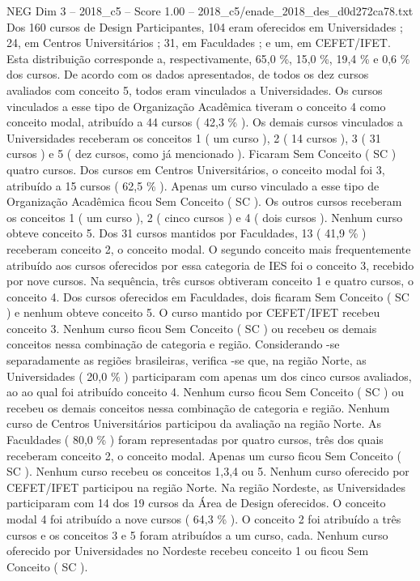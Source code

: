 \begin{textsample}{NEG Dim 3 – 2018\_c5 – Score 1.00 – 2018\_c5/enade\_2018\_des\_d0d272ca78.txt}
Dos 160 cursos de Design Participantes, 104 eram oferecidos em Universidades ; 24, em Centros Universitários ; 31, em Faculdades ; e um, em CEFET/IFET.
Esta distribuição corresponde a, respectivamente, 65,0 \%, 15,0 \%, 19,4 \% e 0,6 \% dos cursos.
De acordo com os dados apresentados, de todos os dez cursos avaliados com conceito 5, todos eram vinculados a Universidades.
Os cursos vinculados a esse tipo de Organização Acadêmica tiveram o conceito 4 como conceito modal, atribuído a 44 cursos ( 42,3 \% ).
Os demais cursos vinculados a Universidades receberam os conceitos 1 ( um curso ), 2 ( 14 cursos ), 3 ( 31 cursos ) e 5 ( dez cursos, como já mencionado ).
Ficaram Sem Conceito ( SC ) quatro cursos.
Dos cursos em Centros Universitários, o conceito modal foi 3, atribuído a 15 cursos ( 62,5 \% ).
Apenas um curso vinculado a esse tipo de Organização Acadêmica ficou Sem Conceito ( SC ).
Os outros cursos receberam os conceitos 1 ( um curso ), 2 ( cinco cursos ) e 4 ( dois cursos ).
Nenhum curso obteve conceito 5.
Dos 31 cursos mantidos por Faculdades, 13 ( 41,9 \% ) receberam conceito 2, o conceito modal.
O segundo conceito mais frequentemente atribuído aos cursos oferecidos por essa categoria de IES foi o conceito 3, recebido por nove cursos.
Na sequência, três cursos obtiveram conceito 1 e quatro cursos, o conceito 4.
Dos cursos oferecidos em Faculdades, dois ficaram Sem Conceito ( SC ) e nenhum obteve conceito 5.
O curso mantido por CEFET/IFET recebeu conceito 3.
Nenhum curso ficou Sem Conceito ( SC ) ou recebeu os demais conceitos nessa combinação de categoria e região.
Considerando -se separadamente as regiões brasileiras, verifica -se que, na região Norte, as Universidades ( 20,0 \% ) participaram com apenas um dos cinco cursos avaliados, ao ao qual foi atribuído conceito 4.
Nenhum curso ficou Sem Conceito ( SC ) ou recebeu os demais conceitos nessa combinação de categoria e região.
Nenhum curso de Centros Universitários participou da avaliação na região Norte.
As Faculdades ( 80,0 \% ) foram representadas por quatro cursos, três dos quais receberam conceito 2, o conceito modal.
Apenas um curso ficou Sem Conceito ( SC ).
Nenhum curso recebeu os conceitos 1,3,4 ou 5.
Nenhum curso oferecido por CEFET/IFET participou na região Norte.
Na região Nordeste, as Universidades participaram com 14 dos 19 cursos da Área de Design oferecidos.
O conceito modal 4 foi atribuído a nove cursos ( 64,3 \% ).
O conceito 2 foi atribuído a três cursos e os conceitos 3 e 5 foram atribuídos a um curso, cada.
Nenhum curso oferecido por Universidades no Nordeste recebeu conceito 1 ou ficou Sem Conceito ( SC ).

\end{textsample}
